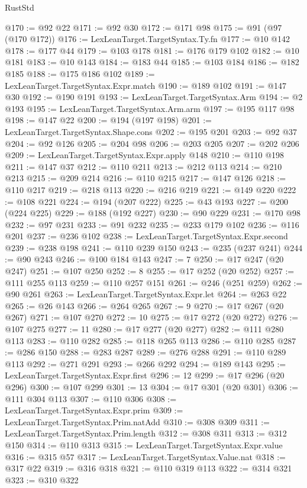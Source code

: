 \begin{lexlean}{RustStd}
\begin{coremodule}
{\begin{coremodule}
{{{{{{{{{{{{{{{{{{{{{{{{{{{{{{{{{{{{{{{{{{{{{@170 := @92 @22
@171 := @92 @30
@172 := @171 @98
@175 := @91 (@97 (@170 @172))
@176 := LexLeanTarget.TargetSyntax.Ty.fn
@177 := @10 @142
@178 := @177 @44
@179 := @103 @178
@181 := @176 @179 @102
@182 := @10 @181
@183 := @10 @143
@184 := @183 @44
@185 := @103 @184
@186 := @182 @185
@188 := @175 @186 @102
@189 := LexLeanTarget.TargetSyntax.Expr.match
@190 := @189 @102
@191 := @147 @30
@192 := @190 @191
@193 := LexLeanTarget.TargetSyntax.Arm
@194 := @2 @193
@195 := LexLeanTarget.TargetSyntax.Arm.arm
@197 := @195 @117 @98
@198 := @147 @22
@200 := @194 (@197 @198)
@201 := LexLeanTarget.TargetSyntax.Shape.cons
@202 := @195 @201
@203 := @92 @37
@204 := @92 @126
@205 := @204 @98
@206 := @203 @205
@207 := @202 @206
@209 := LexLeanTarget.TargetSyntax.Expr.apply @148
@210 := @110 @198
@211 := @147 @37
@212 := @110 @211
@213 := @212 @113
@214 := @210 @213
@215 := @209 @214
@216 := @110 @215
@217 := @147 @126
@218 := @110 @217
@219 := @218 @113
@220 := @216 @219
@221 := @149 @220
@222 := @108 @221
@224 := @194 (@207 @222)
@225 := @43 @193
@227 := @200 (@224 @225)
@229 := @188 (@192 @227)
@230 := @90 @229
@231 := @170 @98
@232 := @97 @231
@233 := @91 @232
@235 := @233 @179 @102
@236 := @116 @201
@237 := @236 @102
@238 := LexLeanTarget.TargetSyntax.Expr.second
@239 := @238 @198
@241 := @110 @239 @150
@243 := @235 (@237 @241)
@244 := @90 @243
@246 := @100 @184 @143
@247 := 7
@250 := @17 @247 (@20 @247)
@251 := @107 @250
@252 := 8
@255 := @17 @252 (@20 @252)
@257 := @111 @255 @113
@259 := @110 @257 @151
@261 := @246 (@251 @259)
@262 := @90 @261
@263 := LexLeanTarget.TargetSyntax.Expr.let
@264 := @263 @22
@265 := @26 @143
@266 := @264 @265
@267 := 9
@270 := @17 @267 (@20 @267)
@271 := @107 @270
@272 := 10
@275 := @17 @272 (@20 @272)
@276 := @107 @275
@277 := 11
@280 := @17 @277 (@20 @277)
@282 := @111 @280 @113
@283 := @110 @282
@285 := @118 @265 @113
@286 := @110 @285
@287 := @286 @150
@288 := @283 @287
@289 := @276 @288
@291 := @110 @289 @113
@292 := @271 @291
@293 := @266 @292
@294 := @189 @143
@295 := LexLeanTarget.TargetSyntax.Expr.first
@296 := 12
@299 := @17 @296 (@20 @296)
@300 := @107 @299
@301 := 13
@304 := @17 @301 (@20 @301)
@306 := @111 @304 @113
@307 := @110 @306
@308 := LexLeanTarget.TargetSyntax.Expr.prim
@309 := LexLeanTarget.TargetSyntax.Prim.natAdd
@310 := @308 @309
@311 := LexLeanTarget.TargetSyntax.Prim.length
@312 := @308 @311
@313 := @312 @150
@314 := @110 @313
@315 := LexLeanTarget.TargetSyntax.Expr.value
@316 := @315 @57
@317 := LexLeanTarget.TargetSyntax.Value.nat
@318 := @317 @22
@319 := @316 @318
@321 := @110 @319 @113
@322 := @314 @321
@323 := @310 @322
}}}}}}}}}}}}}}}}}}}}}}}}}}}}}}}}}}}}}}}}}}}}}
\end{coremodule}}
\end{coremodule}
\end{lexlean}
